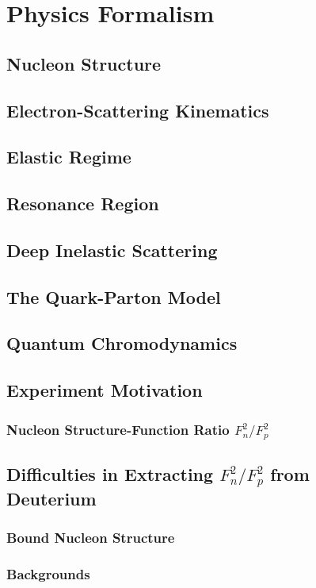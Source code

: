 \chapter{Physics Formalism}
\label{ch:physrev}

\section{Nucleon Structure}
\section{Electron-Scattering Kinematics}
\section{Elastic Regime}
\section{Resonance Region}
\section{Deep Inelastic Scattering}
\section{The Quark-Parton Model}
\section{Quantum Chromodynamics}
\section{Experiment Motivation}
\subsection{Nucleon Structure-Function Ratio $F^2_n/F^2_p$}
\section{Difficulties in Extracting $F^2_n/F^2_p$ from Deuterium}
\subsection{Bound Nucleon Structure}
\subsection{Backgrounds}
